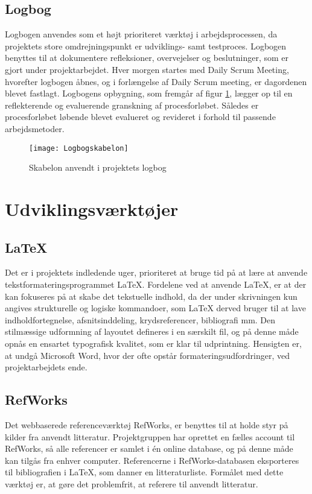 	\subsection{Logbog}
	Logbogen anvendes som et højt prioriteret værktøj i arbejdsprocessen, da projektets store omdrejningspunkt er udviklings- samt testproces. Logbogen benyttes til at dokumentere refleksioner, overvejelser og beslutninger, som er gjort under projektarbejdet. Hver morgen startes med Daily Scrum Meeting, hvorefter logbogen åbnes, og i forlængelse af Daily Scrum meeting, er dagordenen blevet  fastlagt. Logbogens opbygning, som fremgår af figur \ref{fig:logbog}, lægger op til en reflekterende og evaluerende granskning af procesforløbet. Således er procesforløbet løbende blevet evalueret og revideret i forhold til passende arbejdsmetoder. 
	
	\begin{figure}[htb]
	\centering
	\texttt{[image: Logbogskabelon]}
	\caption{Skabelon anvendt i projektets logbog}
	\label{fig:logbog}	
	\end{figure}	

\section{Udviklingsværktøjer}
	 
	\subsection{\LaTeX}
Det er i projektets indledende uger, prioriteret at bruge tid på at lære at anvende tekstformateringsprogrammet \LaTeX. Fordelene ved at anvende LaTeX, er at der kan fokuseres på at skabe det tekstuelle indhold, da der under skrivningen kun angives strukturelle og logiske kommandoer, som LaTeX derved bruger til at lave indholdfortegnelse, afsnitsinddeling, krydsreferencer, bibliografi mm. Den stilmæssige udformning af layoutet defineres i en særskilt fil, og på denne måde opnås en ensartet typografisk kvalitet, som er klar til udprintning. Hensigten er, at undgå Microsoft Word, hvor der ofte opstår formateringsudfordringer, ved projektarbejdets ende. 
    
	\subsection{RefWorks}
Det webbaserede referenceværktøj RefWorks, er benyttes til at holde styr på kilder fra anvendt litteratur. Projektgruppen har oprettet en fælles account til RefWorks, så alle referencer er samlet i én online database, og på denne måde kan tilgås fra enhver computer. Referencerne i RefWorks-databasen eksporteres til bibliografien i LaTeX, som danner en litteraturliste. Formålet med dette værktøj er, at gøre det problemfrit, at referere til anvendt litteratur. 

